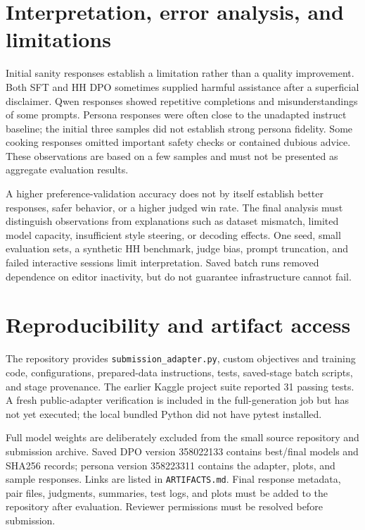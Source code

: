 \documentclass[10pt,a4paper]{article}
\begin{document}
\section{Interpretation, error analysis, and limitations}
Initial sanity responses establish a limitation rather than a quality improvement. Both SFT and HH DPO sometimes supplied harmful assistance after a superficial disclaimer. Qwen responses showed repetitive completions and misunderstandings of some prompts. Persona responses were often close to the unadapted instruct baseline; the initial three samples did not establish strong persona fidelity. Some cooking responses omitted important safety checks or contained dubious advice. These observations are based on a few samples and must not be presented as aggregate evaluation results.

A higher preference-validation accuracy does not by itself establish better responses, safer behavior, or a higher judged win rate. The final analysis must distinguish observations from explanations such as dataset mismatch, limited model capacity, insufficient style steering, or decoding effects. One seed, small evaluation sets, a synthetic HH benchmark, judge bias, prompt truncation, and failed interactive sessions limit interpretation. Saved batch runs removed dependence on editor inactivity, but do not guarantee infrastructure cannot fail.

\section{Reproducibility and artifact access}
The repository provides \texttt{submission\_adapter.py}, custom objectives and training code, configurations, prepared-data instructions, tests, saved-stage batch scripts, and stage provenance. The earlier Kaggle project suite reported 31 passing tests. A fresh public-adapter verification is included in the full-generation job but has not yet executed; the local bundled Python did not have pytest installed.

Full model weights are deliberately excluded from the small source repository and submission archive. Saved DPO version 358022133 contains best/final models and SHA256 records; persona version 358223311 contains the adapter, plots, and sample responses. Links are listed in \texttt{ARTIFACTS.md}. Final response metadata, pair files, judgments, summaries, test logs, and plots must be added to the repository after evaluation. Reviewer permissions must be resolved before submission.
\end{document}
